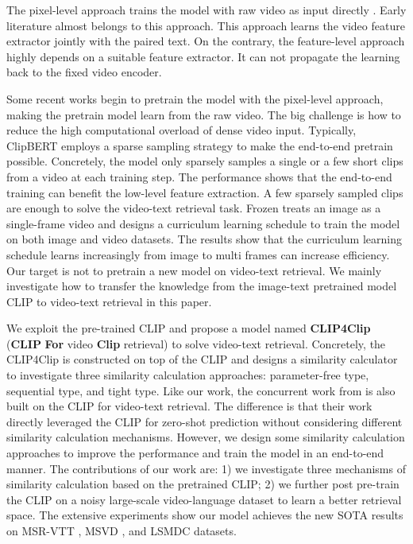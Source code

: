 \documentclass[11pt]{article}
\begin{document}
	The pixel-level approach trains the model with raw video as input directly \cite{Torabi2016Learning,kiros2014unifying,Yu2016Video,Kaufman2017Temporal,Yu2017End,yu2018joint}. Early literature almost belongs to this approach. This approach learns the video feature extractor jointly with the paired text. On the contrary, the feature-level approach highly depends on a suitable feature extractor. It can not propagate the learning back to the fixed video encoder.

	Some recent works begin to pretrain the model with the pixel-level approach, making the pretrain model learn from the raw video. The big challenge is how to reduce the high computational overload of dense video input. Typically, ClipBERT \cite{lei2021less} employs a sparse sampling strategy to make the end-to-end pretrain possible. Concretely, the model only sparsely samples a single or a few short clips from a video at each training step. The performance shows that the end-to-end training can benefit the low-level feature extraction. A few sparsely sampled clips are enough to solve the video-text retrieval task. Frozen \cite{Bain2021Frozen} treats an image as a single-frame video and designs a curriculum learning schedule to train the model on both image and video datasets. The results show that the curriculum learning schedule learns increasingly from image to multi frames can increase efficiency. Our target is not to pretrain a new model on video-text retrieval. We mainly investigate how to transfer the knowledge from the image-text pretrained model CLIP \cite{radford2021learning} to video-text retrieval in this paper.

	We exploit the pre-trained CLIP and propose a model named \textbf{CLIP4Clip} (\textbf{CLIP} \textbf{For} video \textbf{Clip} retrieval) to solve video-text retrieval. Concretely, the CLIP4Clip is constructed on top of the CLIP and designs a similarity calculator to investigate three similarity calculation approaches: parameter-free type, sequential type, and tight type. Like our work, the concurrent work from \citet{PortilloQuintero2021} is also built on the CLIP for video-text retrieval. The difference is that their work directly leveraged the CLIP for zero-shot prediction without considering different similarity calculation mechanisms. However, we design some similarity calculation approaches to improve the performance and train the model in an end-to-end manner. The contributions of our work are: 1) we investigate three mechanisms of similarity calculation based on the pretrained CLIP; 2) we further post pre-train the CLIP on a noisy large-scale video-language dataset to learn a better retrieval space. The extensive experiments show our model achieves the new SOTA results on MSR-VTT \cite{xu2016msr}, MSVD \cite{chen2011collecting}, and LSMDC \cite{Rohrbach2015LSMDC} datasets.
\end{document}
